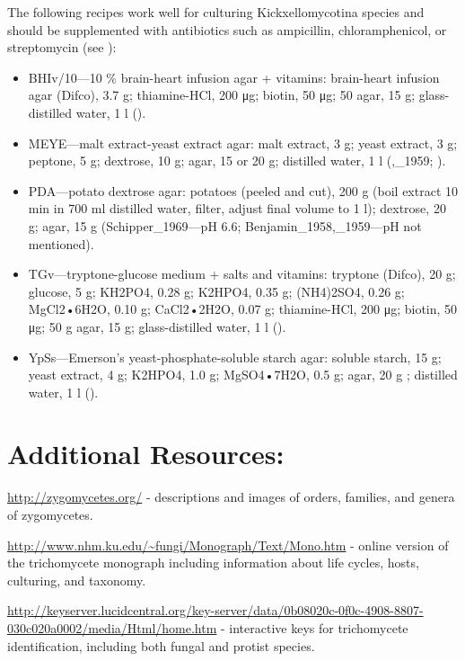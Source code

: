 \documentclass[]{book}
\providecommand{\tightlist}{%
  \setlength{\itemsep}{0pt}\setlength{\parskip}{0pt}}
\begin{document}
The following recipes work well for culturing Kickxellomycotina species and should be supplemented with antibiotics such as ampicillin, chloramphenicol, or streptomycin (see \citet{Benny_2016}):

\begin{itemize}
\tightlist
\item
  BHIv/10---10 \% brain-heart infusion agar + vitamins: brain-heart infusion agar (Difco), 3.7 g; thiamine-HCl, 200 μg; biotin, 50 μg; 50 agar, 15 g; glass-distilled water, 1 l (\citet{Lichtwardt_1986}).
\item
  MEYE---malt extract-yeast extract agar: malt extract, 3 g; yeast extract, 3 g; peptone, 5 g; dextrose, 10 g; agar, 15 or 20 g; distilled water, 1 l (\citet{Benjamin_1958},\_1959; \citet{Benny_1975}).
\item
  PDA---potato dextrose agar: potatoes (peeled and cut), 200 g (boil extract 10 min in 700 ml distilled water, filter, adjust final volume to 1 l); dextrose, 20 g; agar, 15 g (Schipper\_1969---pH 6.6; Benjamin\_1958,\_1959---pH not mentioned).
\item
  TGv---tryptone-glucose medium + salts and vitamins: tryptone (Difco), 20 g; glucose, 5 g; KH2PO4, 0.28 g; K2HPO4, 0.35 g; (NH4)2SO4, 0.26 g; MgCl2•6H2O, 0.10 g; CaCl2•2H2O, 0.07 g; thiamine-HCl, 200 μg; biotin, 50 μg; 50 g agar, 15 g; glass-distilled water, 1 l (\citet{Lichtwardt_1986}).
\item
  YpSs---Emerson's yeast-phosphate-soluble starch agar: soluble starch, 15 g; yeast extract, 4 g; K2HPO4, 1.0 g; MgSO4•7H2O, 0.5 g; agar, 20 g \citep[15 g used later;][]{Benny_1975}; distilled water, 1 l (\citet{Benjamin_1959}).
\end{itemize}

\hypertarget{additional-resources}{%
\section{Additional Resources:}\label{additional-resources}}

\url{http://zygomycetes.org/} - descriptions and images of orders, families, and genera of zygomycetes.

\url{http://www.nhm.ku.edu/~fungi/Monograph/Text/Mono.htm} - online version of the trichomycete monograph including information about life cycles, hosts, culturing, and taxonomy.

\url{http://keyserver.lucidcentral.org/key-server/data/0b08020c-0f0c-4908-8807-030c020a0002/media/Html/home.htm} - interactive keys for trichomycete identification, including both fungal and protist species.
\end{document}
